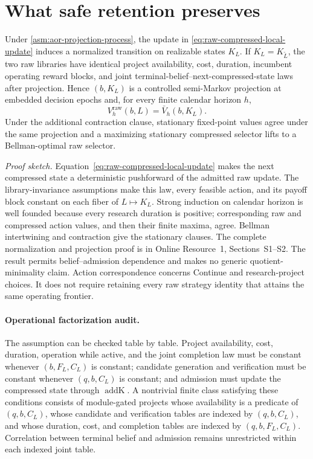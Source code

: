 \section{What safe retention preserves}
\label{sec:preservation}

\begin{theorem}
\label{thm:raw-to-compressed-projection}
Under \cref{asm:aor-projection-process}, the update in
\eqref{eq:raw-compressed-local-update} induces a normalized transition on
realizable states \(K_L\).  If \(K_L=K_{\widetilde L}\), the two raw libraries
have identical project availability, cost, duration, incumbent operating
reward blocks, and joint terminal-belief--next-compressed-state laws after
projection.  Hence \((b,K_L)\) is a controlled semi-Markov projection at
embedded decision epochs and, for every finite calendar horizon \(h\),
\[
  V_h^{\mathrm{raw}}(b,L)=\bar V_h(b,K_L).
\]
Under the additional contraction clause, stationary fixed-point values agree
under the same projection and a maximizing stationary compressed selector
lifts to a Bellman-optimal raw selector.
\end{theorem}

\noindent\emph{Proof sketch.}
Equation~\eqref{eq:raw-compressed-local-update} makes the next compressed state
a deterministic pushforward of the admitted raw update.  The
library-invariance assumptions make this law, every feasible action, and its
payoff block constant on each fiber of \(L\mapsto K_L\).  Strong induction on
calendar horizon is well founded because every research duration is positive;
corresponding raw and compressed action values, and then their finite maxima,
agree.  Bellman intertwining and contraction give the stationary clauses.
The complete normalization and projection proof is in Online Resource~1,
Sections~S1--S2.  The result permits belief--admission dependence and makes no
generic quotient-minimality claim. Action correspondence concerns Continue and
research-project choices. It does not require retaining every raw strategy
identity that attains the same operating frontier.

\paragraph{Operational factorization audit.}
The assumption can be checked table by table. Project availability, cost,
duration, operation while active, and the joint completion law must be constant
whenever \((b,F_L,C_L)\) is constant; candidate generation and verification
must be constant whenever \((q,b,C_L)\) is constant; and admission must update
the compressed state through \(\operatorname{addK}\). A nontrivial finite class
satisfying these conditions consists of module-gated projects whose
availability is a predicate of \((q,b,C_L)\), whose candidate and verification
tables are indexed by \((q,b,C_L)\), and whose duration, cost, and completion
tables are indexed by \((q,b,F_L,C_L)\). Correlation between terminal belief
and admission remains unrestricted within each indexed joint table.


